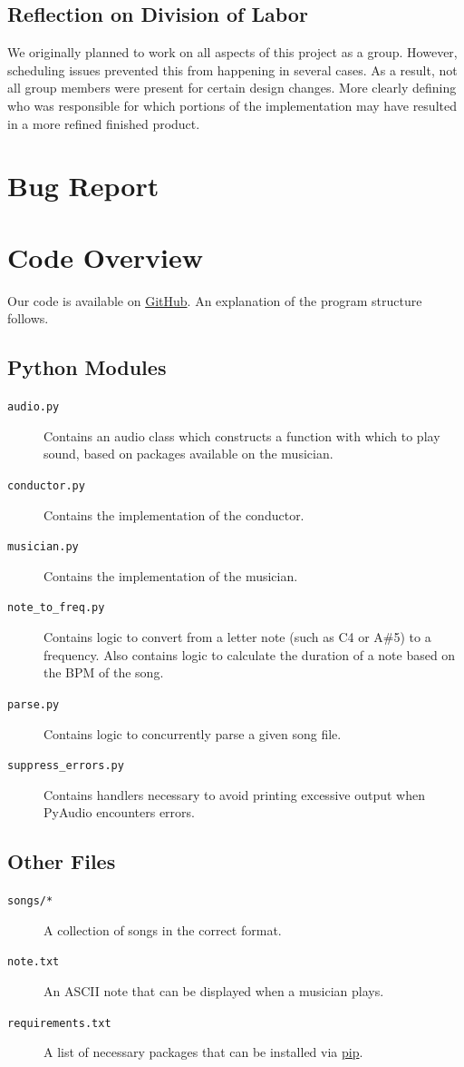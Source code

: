 \documentclass[12pt, letterpaper]{article}
\begin{document}
\subsection{Reflection on Division of Labor}
We originally planned to work on all aspects of this project as a group. However, scheduling issues
prevented this from happening in several cases. As a result, not all group members were present for
certain design changes. More clearly defining who was responsible for which portions of the
implementation may have resulted in a more refined finished product.

\section{Bug Report}

\section{Code Overview}
Our code is available on \href{https://github.com/TylerLubeck/ConcurrentMusic}{GitHub}. An
explanation of the program structure follows.

\subsection{Python Modules}
\begin{description}
\item[\texttt{audio.py}] Contains an audio class which constructs a function with which to play
sound, based on packages available on the musician.
\item[\texttt{conductor.py}] Contains the implementation of the conductor.
\item[\texttt{musician.py}] Contains the implementation of the musician.
\item[\texttt{note\_to\_freq.py}] Contains logic to convert from a letter note (such as C4 or A\#5)
to a frequency. Also contains logic to calculate the duration of a note based on the BPM of the
song.
\item[\texttt{parse.py}] Contains logic to concurrently parse a given song file.
\item[\texttt{suppress\_errors.py}] Contains handlers necessary to avoid printing excessive output
when PyAudio encounters errors.
\end{description}

\subsection{Other Files}
\begin{description}
\item[\texttt{songs/*}] A collection of songs in the correct format.
\item[\texttt{note.txt}] An ASCII note that can be displayed when a musician plays.
\item[\texttt{requirements.txt}] A list of necessary packages that can be installed via
\href{https://pypi.python.org/pypi/pip}{pip}.
\end{description}
\end{document}
